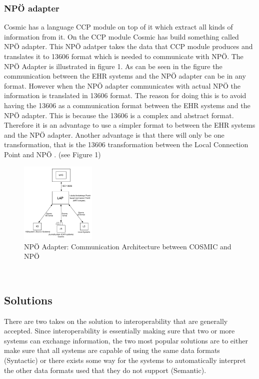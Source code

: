 \documentclass[14pt]{article}
\begin{document}
\subsubsection{NPÖ adapter}
Cosmic has a language CCP module on top of it which extract all kinds of information from it. On the CCP module Cosmic has build something called NPÖ adapter. This NPÖ adatper takes the data that CCP module produces and translates it to 13606 format which is needed to communicate with NPÖ. The NPÖ Adapter is illustrated in figure 1. As can be seen in the figure the communication between the EHR systems and the NPÖ adapter can be in any format. However when the NPÖ adapter communicates with actual NPÖ the information is translated in 13606 format. The reason for doing this is to avoid having the 13606 as a communication format between the \gls{EHR} systems and the NPÖ adapter. This is because the 13606 is a complex and abstract format. Therefore it is an advantage to use a simpler format to between the \gls{EHR} systems and the NPÖ adapter. Another advantage is that there will only be one transformation, that is the 13606 transformation between the Local Connection Point and NPÖ  \cite{ViktorJernelov}. (see Figure 1) 

\begin{figure}[h!]
  \caption{NPÖ Adapter: Communication Architecture between COSMIC and NPÖ}
  \centering
    \includegraphics[width=0.32\textwidth]{Images/npoAdapt}
\end{figure}\

\subsection{Solutions}
There are two takes on the solution to interoperability that are generally accepted.  Since interoperability is essentially making sure that two or more systems can exchange information, the two most popular solutions are to either make sure that all systems are capable of using the same data formats (Syntactic) or there exists some way for the systems to automatically interpret the other data formats used that they do not support (Semantic).
\end{document}
